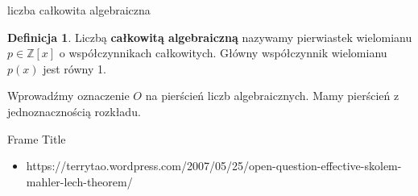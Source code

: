 \documentclass[handout]{beamer}
\def\Z{\mathbb Z}
\theoremstyle{definition}
\newtheorem*{definicja}{Definicja}
\begin{document}
\begin{frame}{liczba całkowita algebraiczna}
    \begin{definicja}
        Liczbą \textbf{całkowitą algebraiczną} nazywamy pierwiastek wielomianu $p \in \Z[x]$ o współczynnikach całkowitych. Główny współczynnik wielomianu $p(x)$ jest równy 1. 
    \end{definicja}
    Wprowadźmy oznaczenie $O$ na pierścień liczb algebraicznych. Mamy pierścień z jednoznacznością rozkładu. 
\end{frame}

\begin{frame}{Frame Title}
    
\end{frame}


\begin{frame}


\begin{itemize}
    \item https://terrytao.wordpress.com/2007/05/25/open-question-effective-skolem-mahler-lech-theorem/
\end{itemize}
\end{frame}
\end{document}
